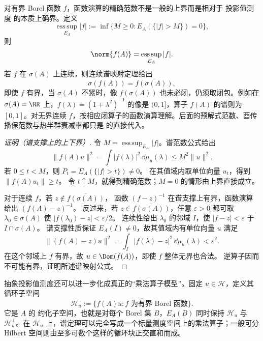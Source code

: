 \begin{proposition}[函数演算的精确范数与谱映射]
对有界 Borel 函数 $f$，函数演算的精确范数不是一般的上界而是相对于 投影值测度 的本质上确界。定义
\[
 \operatorname*{ess\,sup}_{E_A}|f|
 :=\inf\{M\ge0:E_A(\{|f|>M\})=0\},
\]
则
\begin{equation}\label{eq:math-sl-functional-calculus-norm}
 \norm{f(A)}=\operatorname*{ess\,sup}_{E_A}|f|.
\end{equation}
若 $f$ 在 $\sigma(A)$ 上连续，则连续谱映射定理给出
\begin{equation*}\sigma(f(A))=\overline{f(\sigma(A))},
\end{equation*}
即使 $f$ 有界，当 $\sigma(A)$ 不紧时，像 $f(\sigma(A))$ 也未必闭，仍须取闭包。例如在 $\sigma(A)=\RR$ 上，$f(\lambda)=(1+\lambda^2)^{-1}$ 的像是 $(0,1]$，算子 $f(A)$ 的谱则为 $[0,1]$。对无界连续 $f$，按相应闭算子的函数演算理解。后面的预解式范数、酉传播保范数与热半群衰减率都只是 的直接代入。
\end{proposition}

\begin{proof}[证明（谱支撑上的上下界）]
令 $M=\operatorname*{ess\,sup}_{E_A}|f|$。谱范数公式给出
\[
\|f(A)u\|^2=\int|f(\lambda)|^2\,\dd\mu_u(\lambda)
\le M^2\|u\|^2.
\]
若 $0\le t<M$，则 $P_t=E_A(\{|f|>t\})\ne0$。
在其值域内取单位向量 $u_t$，得到 $\|f(A)u_t\|\ge t$。
令 $t\uparrow M$，就得到精确范数；$M=0$ 的情形由上界直接成立。

对于连续 $f$，若 $z\notin\overline{f(\sigma(A))}$，
函数 $(f-z)^{-1}$ 在谱支撑上有界，函数演算给出 $(f(A)-z)^{-1}$。
反过来，若 $z\in\overline{f(\sigma(A))}$，任意 $\varepsilon>0$ 都可取
$\lambda_0\in\sigma(A)$ 使 $|f(\lambda_0)-z|<\varepsilon/2$。
连续性给出 $\lambda_0$ 的邻域 $I$，使 $|f-z|<\varepsilon$ 于 $I\cap\sigma(A)$。
谱支撑性质保证 $E_A(I)\ne0$，故其值域内有单位向量 $u$ 满足
\[
\|(f(A)-z)u\|^2
=\int_I|f(\lambda)-z|^2\,\dd\mu_u(\lambda)<\varepsilon^2.
\]
在这个邻域上 $f$ 有界，故 $u\in\Dom(f(A))$，即使 $f$ 整体无界也合法。
逆算子因而不可能有界，证明所述谱映射公式。
\end{proof}

抽象投影值测度还可以进一步化成真正的“乘法算子模型”。固定 $u\in\mathcal H$，定义其循环子空间
\begin{equation}\label{eq:math-sl-cyclic-subspace}
 \mathcal H_u
 :=\overline{\{f(A)u:f\text{ 为有界 Borel 函数}\}}.
\end{equation}
它是 $A$ 的 约化子空间，也就是对每个 Borel 集 $B$，$E_A(B)$ 同时保持 $\mathcal H_u$ 与 $\mathcal H_u^\perp$。在 $\mathcal H_u$ 上，谱定理可以完全写成一个标量测度空间上的乘法算子；一般可分 Hilbert 空间则由至多可数个这样的循环块正交直和而成。

